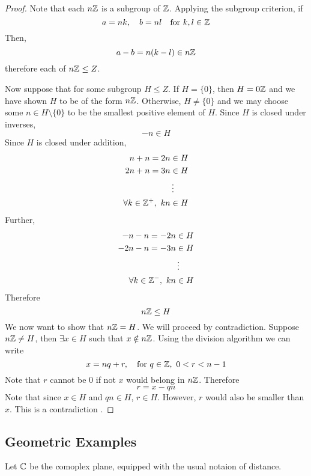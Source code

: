 \documentclass{article}
\begin{document}

\begin{proof}
    Note that each $n\mathbb{Z}$ is a subgroup of $\mathbb{Z}$. Applying the subgroup criterion, if
    \[
        a = nk, \quad b = nl \quad \text{for} \ k, l \in \mathbb{Z}  
    \]
    Then,
    \[
        a - b = n(k - l) \in n\mathbb{Z}  
    \]
    therefore each of $n\mathbb{Z} \leq Z$.

    Now suppose that for some subgroup $H \leq Z$. 
    If $H = \{0\}$, then $H = 0\mathbb{Z}$ and we have shown $H$ to be of the form $n\mathbb{Z}$.
    Otherwise, $H \neq \{0\}$ and we may choose some $n \in H \setminus \{0\}$ to be the smallest positive element of $H$. Since $H$ is closed under inverses,
    \[
        -n \in H  
    \]
    Since $H$ is closed under addition,
    \begin{align*}
        n + n = 2n &\in H \\
        2n + n = 3n &\in H \\
        &\vdots \\
        \forall k \in \mathbb{Z}^+, \ kn &\in H 
    \end{align*}
    Further,
    \begin{align*}
        -n - n = -2n &\in H \\
        -2n - n = -3n &\in H \\
        &\vdots \\
        \forall k \in \mathbb{Z}^-, \ kn &\in H 
    \end{align*}
    Therefore
    \[
        n\mathbb{Z} \leq H  
    \]
    We now want to show that $n\mathbb{Z} = H$. We will proceed by contradiction. Suppose $n\mathbb{Z} \neq H$, then $\exists x \in H$ such that $x \notin n\mathbb{Z}$. Using the division algorithm we can write
    \[
        x = nq + r, \quad \text{for} \ q \in \mathbb{Z}, \ 0 < r < n-1  
    \]
    Note that $r$ cannot be $0$ if not $x$ would belong in $n\mathbb{Z}$. Therefore
    \[
        r = x - qn  
    \]
    Note that since $x \in H$ and $qn \in H$, $r \in H$. However, $r$ would also be smaller than $x$. This is a contradiction \contradiction.
\end{proof}

\subsection{Geometric Examples}

Let $\mathbb{C}$ be the comoplex plane, equipped with the usual notaion of distance.

\end{document}
